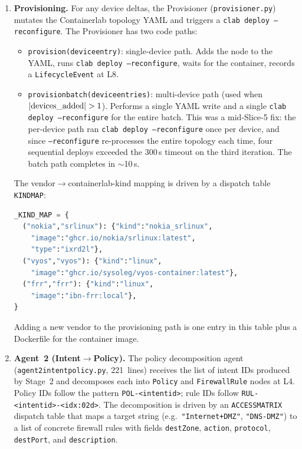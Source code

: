 \documentclass[acmtog]{acmart}
\renewcommand\_{\textunderscore\allowbreak}
\begin{document}
\begin{enumerate}[label=\textbf{Stage~\arabic*.},leftmargin=3em]
    For device changes, Agent~1 also handles lifecycle state: new
    devices enter as \texttt{lifecycleState = PLANNED}, modified
    devices are updated in place, and removed devices are marked
    \texttt{RETIRED} (soft delete---the node stays in the graph for
    audit).

  \item \textbf{Provisioning.}
    For any device deltas, the Provisioner
    (\texttt{provisioner.py}) mutates the Containerlab topology YAML
    and triggers a \texttt{clab deploy --reconfigure}. The
    Provisioner has two code paths:

    \begin{itemize}
      \item \texttt{provision(device\_entry)}: single-device path.
        Adds the node to the YAML, runs \texttt{clab deploy
        --reconfigure}, waits for the container, records a
        \texttt{LifecycleEvent} at L8.
      \item \texttt{provision\_batch(device\_entries)}: multi-device
        path (used when $|\text{devices\_added}| > 1$). Performs a
        single YAML write and a single \texttt{clab deploy
        --reconfigure} for the entire batch. This was a mid-Slice-5
        fix: the per-device path ran \texttt{clab deploy
        --reconfigure} once per device, and since \texttt{--reconfigure}
        re-processes the entire topology each time, four sequential
        deploys exceeded the 300\,s timeout on the third iteration.
        The batch path completes in $\sim$10\,s.
    \end{itemize}

    The vendor$\rightarrow$containerlab-kind mapping is driven by a
    dispatch table \texttt{\_KIND\_MAP}:

    \begin{lstlisting}[language=Python,caption={Vendor dispatch for Containerlab kinds.}]
_KIND_MAP = {
  ("nokia","srlinux"): {"kind":"nokia_srlinux",
    "image":"ghcr.io/nokia/srlinux:latest",
    "type":"ixrd2l"},
  ("vyos","vyos"): {"kind":"linux",
    "image":"ghcr.io/sysoleg/vyos-container:latest"},
  ("frr","frr"): {"kind":"linux",
    "image":"ibn-frr:local"},
}
    \end{lstlisting}

    Adding a new vendor to the provisioning path is one entry in
    this table plus a Dockerfile for the container image.

  \item \textbf{Agent~2 (Intent$\rightarrow$Policy).}
    The policy decomposition agent (\texttt{agent2\_intent\_policy.py},
    221~lines) receives the list of intent IDs produced by Stage~2 and
    decomposes each into \texttt{Policy} and \texttt{FirewallRule}
    nodes at L4. Policy IDs follow the pattern
    \texttt{POL-<intent\_id>}; rule IDs follow
    \texttt{RUL-<intent\_id>-<idx:02d>}. The decomposition is driven
    by an \texttt{ACCESS\_MATRIX} dispatch table that maps a target
    string (e.g.\ \texttt{"Internet+DMZ"}, \texttt{"DNS-DMZ"}) to a
    list of concrete firewall rules with fields \texttt{destZone},
    \texttt{action}, \texttt{protocol}, \texttt{destPort}, and
    \texttt{description}.


\end{enumerate}
\end{document}
